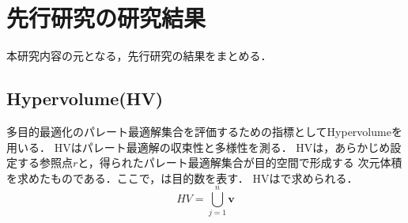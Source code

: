 \documentclass[main]{subfiles}
\begin{document}
    \chapter{先行研究の研究結果}
    本研究内容の元となる，先行研究の結果をまとめる\cite{senkoukenkyu}．

    \section{Hypervolume(HV)}
    多目的最適化のパレート最適解集合を評価するための指標としてHypervolumeを用いる\cite{hv}．
    HVはパレート最適解の収束性と多様性を測る．
    HVは，あらかじめ設定する参照点\boldmath$r$と，得られたパレート最適解集合が目的空間で形成する
    次元体積を求めたものである．ここで，は目的数を表す．
    HVは\label{hv_siki}で求められる．
    \begin{equation}
        HV = \bigcup_{j=1}^n \mathbf{v}
        \label{hv_siki}
    \end{equation}
\end{document}
